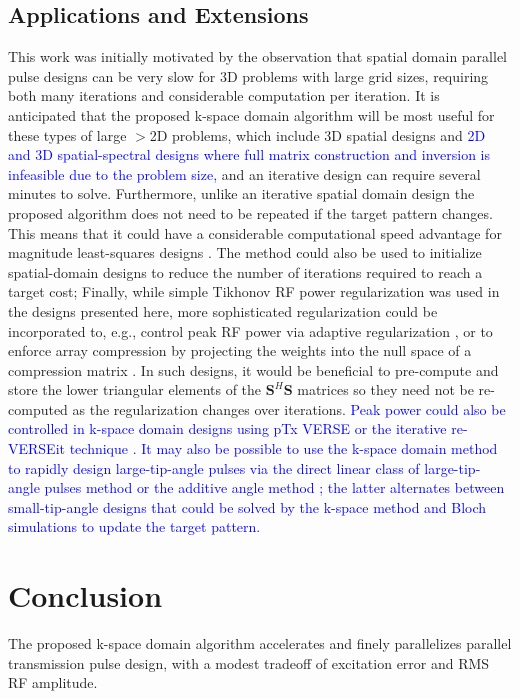 \subsection*{Applications and Extensions}
This work was initially motivated by the observation that spatial domain parallel pulse designs can be very slow
for 3D problems with large grid sizes, 
requiring both many iterations and considerable computation per iteration. 
It is anticipated that the proposed k-space domain algorithm will be most useful for these types of large $>$2D problems,
which include 3D spatial designs \cite{malik2012tailored,davids2016fast} and \textcolor{blue}{2D and 3D spatial-spectral designs \cite{stenger2000three,setsompop2009,Malik:2010aa,yang2010four}
where full matrix construction and inversion is infeasible due to the problem size, }
and an iterative design can require several minutes to solve. 
Furthermore, unlike an iterative spatial domain design the proposed algorithm does not need to be repeated if the target pattern changes.
This means that it could have a considerable computational speed advantage for magnitude least-squares designs \cite{setsompop2008magnitude,malik:mrm:2015}. 
The method could also be used to initialize spatial-domain designs to reduce the number of iterations required to reach a target cost; 
Finally, while simple Tikhonov RF power regularization was used in the designs presented here,
more sophisticated regularization could be incorporated to, e.g., control peak RF power via adaptive regularization \cite{Yip:2005:Magn-Reson-Med:16155881},
or to enforce array compression by projecting the weights into the null space of a compression matrix \cite{cao2016array}.
In such designs, it would be beneficial to pre-compute and store the lower triangular elements of the $\bm{S}^H\bm{S}$ matrices
so they need not be re-computed as the regularization changes over iterations.  
\textcolor{blue}{Peak power could also be controlled in k-space domain designs using pTx VERSE \cite{Lee:2011:MRM} or the iterative re-VERSEit technique \cite{lee2009tod}.} 
\textcolor{blue}{It may also be possible to use the k-space domain method to rapidly design large-tip-angle pulses via the direct linear class of large-tip-angle pulses method \cite{Xu:2008aa} or the additive angle method \cite{grissom:mrm:2008}; 
the latter alternates between small-tip-angle designs that could be solved by the k-space method and Bloch simulations to update the target pattern.} 


\section*{Conclusion}
The proposed k-space domain algorithm accelerates and finely parallelizes parallel transmission pulse design,
with a modest tradeoff of excitation error and RMS RF amplitude.